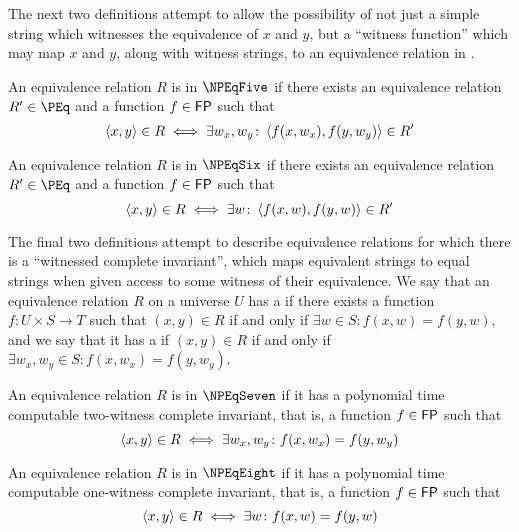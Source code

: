 The next two definitions attempt to allow the possibility of not just a simple string which witnesses the equivalence of $x$ and $y$, but a ``witness function'' which may map $x$ and $y$, along with witness strings, to an equivalence relation in \PEq.
\begin{definition}\label{def:npeq5}
  An equivalence relation $R$ is in $\NPEqFive$ if there exists an equivalence relation $R'\in \PEq$ and a function $f\in{\ensuremath{\mathsf{FP}}}$ such that
  \begin{displaymath}
    \left\langle x,y\right\rangle\in R\iff \exists w_x,w_y\colon \left\langle f(x, w_x),f(y, w_y)\right\rangle\in R'
  \end{displaymath}
\end{definition}
\begin{definition}\label{def:npeq6}
  An equivalence relation $R$ is in $\NPEqSix$ if there exists an equivalence relation $R'\in \PEq$ and a function $f\in{\ensuremath{\mathsf{FP}}}$ such that
  \begin{displaymath}
    \left\langle x,y\right\rangle\in R\iff \exists w\colon \left\langle f(x, w),f(y, w)\right\rangle\in R'
  \end{displaymath}
\end{definition}

The final two definitions attempt to describe equivalence relations for which there is a ``witnessed complete invariant'', which maps equivalent strings to equal strings when given access to some witness of their equivalence.
We say that an equivalence relation $R$ on a universe $U$ has a  if there exists a function $f\colon U\times S\to T$ such that $(x,y)\in R$ if and only if $\exists w\in S\colon f(x, w)=f(y, w)$, and we say that it has a  if $(x, y)\in R$ if and only if $\exists w_x, w_y\in S\colon f(x, w_x)=f(y, w_y)$.
\begin{definition}\label{def:npeq7}
  An equivalence relation $R$ is in $\NPEqSeven$ if it has a polynomial time computable two-witness complete invariant, that is, a function $f\in{\ensuremath{\mathsf{FP}}}$ such that
  \begin{displaymath}
    \left\langle x,y\right\rangle\in R\iff \exists w_x, w_y\colon f(x, w_x) = f(y, w_y)
  \end{displaymath}
\end{definition}
\begin{definition}\label{def:npeq8}
  An equivalence relation $R$ is in $\NPEqEight$ if it has a polynomial time computable one-witness complete invariant, that is, a function $f\in{\ensuremath{\mathsf{FP}}}$ such that
  \begin{displaymath}
    \left\langle x,y\right\rangle\in R\iff \exists w\colon f(x, w) = f(y, w)
  \end{displaymath}
\end{definition}

